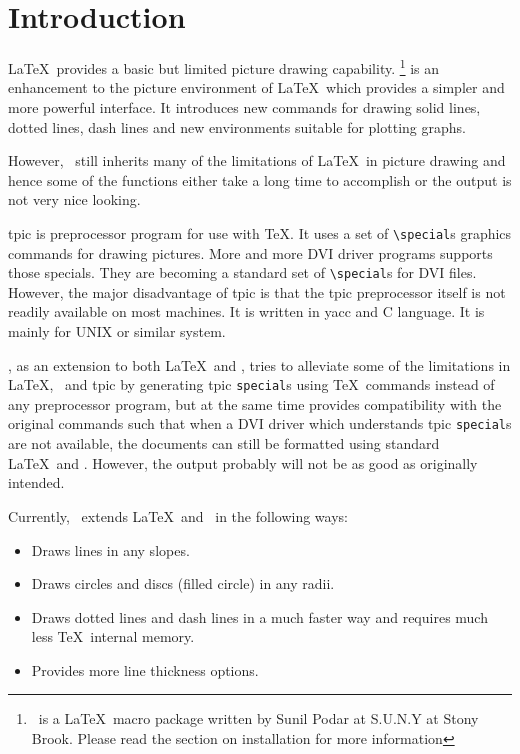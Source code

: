 \section{Introduction}
\LaTeX\ provides a basic but limited picture drawing capability.
\epic\footnote{\epic\ is a \LaTeX\ macro package written by Sunil
Podar at S.U.N.Y at Stony Brook. Please read the section on
installation for more information} is an enhancement to the
picture environment of \LaTeX\ which provides a simpler and more
powerful interface. It introduces new commands for drawing solid
lines, dotted lines, dash lines and new environments suitable for
plotting graphs.

However, \epic\ still inherits many of the limitations of
\LaTeX\ in picture drawing and hence some of the functions either
take a long time to accomplish or the output is not very nice
looking.

tpic is preprocessor program for use with \TeX. It uses a set of
\verb|\special|s graphics commands for drawing pictures. More and
more DVI driver programs supports those specials. They are
becoming a standard set of \verb|\special|s for DVI files.
However, the major disadvantage of tpic is that the tpic
preprocessor itself is not readily available on most machines. It
is written in yacc and C language. It is mainly for UNIX or
similar system.

\eepic, as an extension to both \LaTeX\ and \epic, tries to
alleviate some of the limitations in \LaTeX, \epic\ and tpic by
generating tpic \verb|special|s using \TeX\ commands instead of
any preprocessor program, but at the same time provides
compatibility with the original commands such that when a DVI
driver which understands tpic \verb|special|s are not available,
the documents can still be formatted using standard \LaTeX\ and
\epic. However, the output probably will not be as good as
originally intended.

Currently, \eepic\ extends \LaTeX\ and \epic\ in the following
ways:
\begin{itemize}\parskip=0pt
\item Draws lines in any slopes.
\item Draws circles and discs (filled circle) in any radii.
\item Draws dotted lines and dash lines in a much faster way and
requires much less \TeX\ internal memory.
\item Provides more line thickness options.
\end{itemize}

